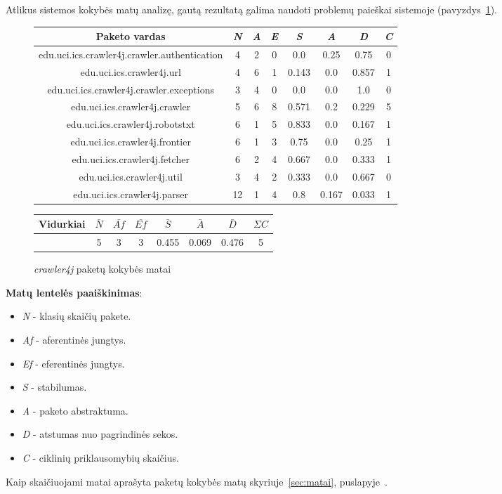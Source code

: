 Atlikus sistemos kokybės matų analizę, gautą rezultatą galima naudoti problemų paieškai sistemoje (pavyzdys~\ref{table:crawlers}).
\begin{figure}[H]
\begin{center}
    \begin{tabular}{|c|c|c|c|c|c|c|c|}
        \hline
        Paketo vardas & \textit{N} & \textit{A} & \textit{E} & \textit{S} & \textit{A} & \textit{D} & \textit{C} \\ [0.5ex]
        \hline\hline
        edu.uci.ics.crawler4j.crawler.authentication & 4 & 2 & 0 & 0.0 & 0.25 & 0.75 & 0\\
        \hline
        edu.uci.ics.crawler4j.url & 4 & 6 & 1 & 0.143 & 0.0 & 0.857 & 1 \\
        \hline
        edu.uci.ics.crawler4j.crawler.exceptions & 3 & 4 & 0 & 0.0 & 0.0 & 1.0 & 0\\
        \hline
        edu.uci.ics.crawler4j.crawler & 5 & 6 & 8 & 0.571 & 0.2 & 0.229 & 5 \\
        \hline
        edu.uci.ics.crawler4j.robotstxt & 6 & 1 & 5 & 0.833 & 0.0 & 0.167 & 1 \\
        \hline
        edu.uci.ics.crawler4j.frontier & 6 & 1 & 3 & 0.75 & 0.0 & 0.25 & 1 \\
        \hline
        edu.uci.ics.crawler4j.fetcher & 6 & 2 & 4 & 0.667 & 0.0 & 0.333 & 1 \\
        \hline
        edu.uci.ics.crawler4j.util & 3 & 4 & 2 & 0.333 & 0.0 & 0.667 & 0 \\
        \hline
        edu.uci.ics.crawler4j.parser & 12 & 1 & 4 & 0.8 & 0.167 & 0.033 & 1 \\
        \hline
    \end{tabular}
    \begin{tabular}{|c|c|c|c|c|c|c|c|}
        \hline
        Vidurkiai & $\bar{N}$ & $\bar{Af}$ & $\bar{Ef}$ & $\bar{S}$ & $\bar{A}$ & $\bar{D}$ & $\Sigma C$  \\ [0.5ex]
        \hline\hline
        & 5 & 3 & 3 & 0.455 & 0.069 & 0.476 & 5\\
        \hline
    \end{tabular}
\end{center}
\caption{\textit{crawler4j} paketų kokybės matai}
\label{table:crawlers}
\end{figure}
\textbf{Matų lentelės paaiškinimas}:
\begin{itemize}
    \item \textit{N} - klasių skaičių pakete.
    \item \textit{Af} - aferentinės jungtys.
    \item \textit{Ef} - eferentinės jungtys.
    \item \textit{S} - stabilumas.
    \item \textit{A} - paketo abstraktuma.
    \item \textit{D} - atstumas nuo pagrindinės sekos.
    \item \textit{C} - ciklinių priklausomybių skaičius.
\end{itemize}
Kaip skaičiuojami matai aprašyta paketų kokybės matų skyriuje~\ref{sec:matai}, puslapyje~\pageref{sec:matai}.

